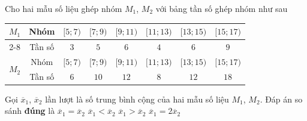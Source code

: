 \begin{ex}%
	Cho hai mẫu số liệu ghép nhóm $M_1$, $M_2$ với bảng tần số ghép nhóm như sau
	\begin{center}
		\begin{tabular}{|c|c|c|c|c|c|c|c|}
			\hline
			\multirow{2}{*}{$M_1$} & Nhóm & $[5;7)$ & $[7;9)$ & $[9;11)$ & $[11;13)$ & $[13;15)$ & $[15;17)$\\
			\cline{2-8}
			& Tần số & $3$ & $5$ & $6$ & $4$ & $6$ & $9$\\
			\hline
			\multirow{2}{*}{$M_2$} & Nhóm & $[5;7)$ & $[7;9)$ & $[9;11)$ & $[11;13)$ & $[13;15)$ & $[15;17)$\\
			\cline{2-8}
			& Tần số & $6$ & $10$ & $12$ & $8$ & $12$ & $18$\\
			\hline
		\end{tabular}
	\end{center}
	Gọi $\overline{x}_1$, $\overline{x}_2$ lần lượt là số trung bình cộng của hai mẫu số liệu $M_1$, $M_2$. Đáp án so sánh \textbf{đúng} là
	\choice
	{\True $\overline{x}_1=\overline{x}_2$}
	{$\overline{x}_1<\overline{x}_2$}
	{$\overline{x}_1>\overline{x}_2$}
	{$\overline{x}_1=2\overline{x}_2$}
\end{ex}

